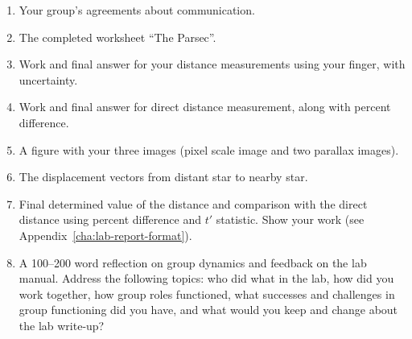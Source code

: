 \begin{enumerate}
	\item Your group's agreements about communication.
	\item The completed worksheet ``The Parsec''.
	\item Work and final answer for your distance measurements using your finger, with uncertainty.
	\item Work and final answer for direct distance measurement, along with percent difference.
	\item A figure with your three images (pixel scale image and two parallax images).
	\item The displacement vectors from distant star to nearby star.
	\item Final determined value of the distance and comparison with the direct distance using percent difference and $t'$ statistic. Show your work (see Appendix~\ref{cha:lab-report-format}).
	\item A 100--200 word reflection on group dynamics and feedback on the lab manual. Address the following topics: who did what in the lab, how did you work together, how group roles functioned, what successes and challenges in group functioning did you have, and what would you keep and change about the lab write-up?
\end{enumerate}